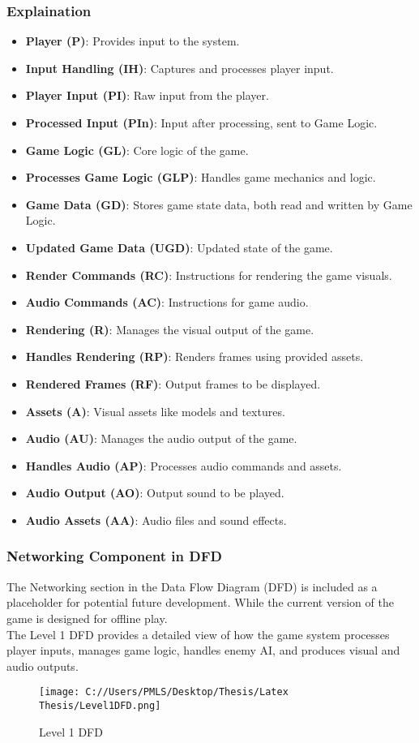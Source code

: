 \subsubsection{Explaination}
\begin{itemize}
	\item \textbf{Player (P)}: Provides input to the system.
	\item \textbf{Input Handling (IH)}: Captures and processes player input.
	\item \textbf{Player Input (PI)}: Raw input from the player.
	\item \textbf{Processed Input (PIn)}: Input after processing, sent to Game Logic.
	\item \textbf{Game Logic (GL)}: Core logic of the game.
	\item \textbf{Processes Game Logic (GLP)}: Handles game mechanics and logic.
	\item \textbf{Game Data (GD)}: Stores game state data, both read and written by Game Logic.
	\item \textbf{Updated Game Data (UGD)}: Updated state of the game.
	\item \textbf{Render Commands (RC)}: Instructions for rendering the game visuals.
	\item \textbf{Audio Commands (AC)}: Instructions for game audio.
	\item \textbf{Rendering (R)}: Manages the visual output of the game.
	\item \textbf{Handles Rendering (RP)}: Renders frames using provided assets.
	\item \textbf{Rendered Frames (RF)}: Output frames to be displayed.
	\item \textbf{Assets (A)}: Visual assets like models and textures.
	\item \textbf{Audio (AU)}: Manages the audio output of the game.
	\item \textbf{Handles Audio (AP)}: Processes audio commands and assets.
	\item \textbf{Audio Output (AO)}: Output sound to be played.
	\item \textbf{Audio Assets (AA)}: Audio files and sound effects.
\end{itemize}
\subsubsection{Networking Component in DFD}
The Networking section in the Data Flow Diagram (DFD) is included as a placeholder for potential future development. While the current version of the game is designed for offline play.\\
The Level 1 DFD provides a detailed view of how the game system processes player inputs, manages game logic, handles enemy AI, and produces visual and audio outputs.\\
\begin{figure}[H]
	\centering
	\texttt{[image: C://Users/PMLS/Desktop/Thesis/Latex Thesis/Level1DFD.png]}
	\caption{Level 1 DFD}
	\label{fig:Level 1 Data Flow Diagram}
\end{figure}

